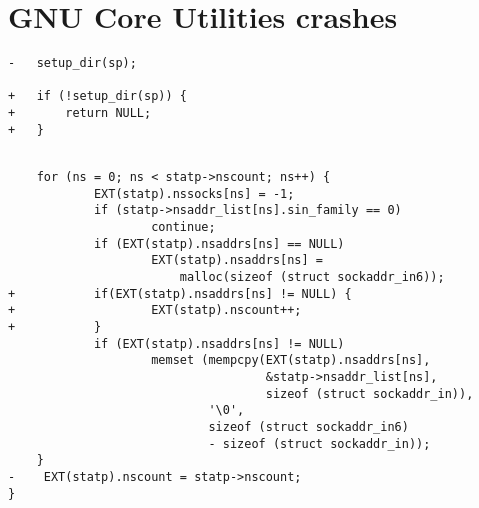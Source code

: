 \section{GNU Core Utilities crashes}

\lstset{numbers=left}
\begin{lstlisting}[label={lst:du/malloc},firstnumber=986, caption={\texttt{du} crashes when \texttt{malloc} returns an error. The offending code is in the coreutils 8.25 source code, in \texttt{lib/fts.c:986}.}]
-	setup_dir(sp);

+	if (!setup_dir(sp)) {
+		return NULL;
+	}
\end{lstlisting}

\begin{lstlisting}[label={lst:hostid/malloc},firstnumber=425, caption={\texttt{hostid} crashes when \texttt{malloc} returns an error. The offending code is in the GLibC 2.23 source code, in \texttt{resolv/res\_send.c:453}.}]

    for (ns = 0; ns < statp->nscount; ns++) {
            EXT(statp).nssocks[ns] = -1;
            if (statp->nsaddr_list[ns].sin_family == 0)
                    continue;
            if (EXT(statp).nsaddrs[ns] == NULL)
                    EXT(statp).nsaddrs[ns] =
                        malloc(sizeof (struct sockaddr_in6));
+	        if(EXT(statp).nsaddrs[ns] != NULL) {
+	                EXT(statp).nscount++;
+	        }
            if (EXT(statp).nsaddrs[ns] != NULL)
                    memset (mempcpy(EXT(statp).nsaddrs[ns],
                                    &statp->nsaddr_list[ns],
                                    sizeof (struct sockaddr_in)),
                            '\0',
                            sizeof (struct sockaddr_in6)
                            - sizeof (struct sockaddr_in));
    }
-    EXT(statp).nscount = statp->nscount;
}
\end{lstlisting}
